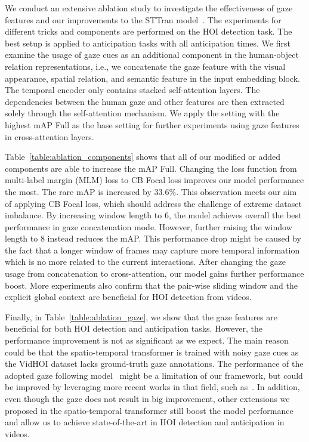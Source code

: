 \documentclass[times,twocolumn,final,authoryear]{elsarticle}
\begin{document}
We conduct an extensive ablation study to investigate the effectiveness of gaze features and our improvements to the STTran model~\citep{hoi_v2:sttran}. The experiments for different tricks and components are performed on the HOI detection task. The best setup is applied to anticipation tasks with all anticipation times. We first examine the usage of gaze cues as an additional component in the human-object relation representations, i.e., we concatenate the gaze feature with the visual appearance, spatial relation, and semantic feature in the input embedding block. The temporal encoder only contains stacked self-attention layers. The dependencies between the human gaze and other features are then extracted solely through the self-attention mechanism. We apply the setting with the highest mAP Full as the base setting for further experiments using gaze features in cross-attention layers.

Table~\ref{table:ablation_components} shows that all of our modified or added components are able to increase the mAP Full. Changing the loss function from multi-label margin (MLM) loss to CB Focal loss improves our model performance the most. The rare mAP is increased by $33.6\%$. This observation meets our aim of applying CB Focal loss, which should address the challenge of extreme dataset imbalance. By increasing window length to $6$, the model achieves overall the best performance in gaze concatenation mode. However, further raising the window length to $8$ instead reduces the mAP. This performance drop might be caused by the fact that a longer window of frames may capture more temporal information which is no more related to the current interactions. After changing the gaze usage from concatenation to cross-attention, our model gains further performance boost. More experiments also confirm that the pair-wise sliding window and the explicit global context are beneficial for HOI detection from videos.

Finally, in Table~\ref{table:ablation_gaze}, we show that the gaze features are beneficial for both HOI detection and anticipation tasks. However, the performance improvement is not as significant as we expect. The main reason could be that the spatio-temporal transformer is trained with noisy gaze cues as the VidHOI dataset lacks ground-truth gaze annotations. The performance of the adopted gaze following model~\citep{gaze:detecting_attended} might be a limitation of our framework, but could be improved by leveraging more recent works in that field, such as~\citep{gaze:end_to_end, gaze:dam}. In addition, even though the gaze does not result in big improvement, other extensions we proposed in the spatio-temporal transformer still boost the model performance and allow us to achieve state-of-the-art in HOI detection and anticipation in videos.
\end{document}
